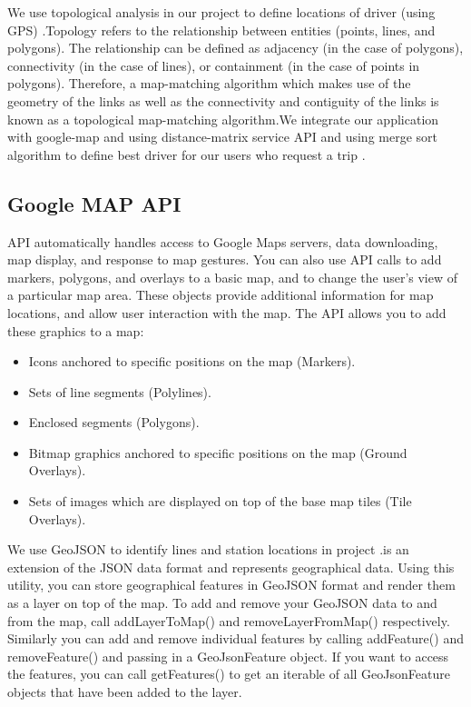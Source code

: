 We use topological analysis in our project to define locations of driver (using GPS) .Topology refers to the relationship between entities (points, lines, and polygons). The relationship can be defined as adjacency (in the case of polygons), connectivity (in the case of lines), or containment (in the
case of points in polygons). Therefore, a map-matching algorithm which makes use of the geometry of the
links as well as the connectivity and contiguity of the links is known as a topological map-matching algorithm.We integrate our application with google-map and using distance-matrix service API and using merge sort algorithm to define best driver for our users who request a trip .

\subsection{Google MAP API}

\hspace{2cm} API automatically handles access to Google Maps servers, data downloading, map display, and response to map gestures. You can also use API calls to add markers, polygons, and overlays to a basic map, and to change the user's view of a particular map area. These objects provide additional information for map locations, and allow user interaction with the map. The API allows you to add these graphics to a map:

\begin{itemize}
    
\item Icons anchored to specific positions on the map (Markers).
\item Sets of line segments (Polylines).
\item Enclosed segments (Polygons).
\item Bitmap graphics anchored to specific positions on the map (Ground Overlays).
\item Sets of images which are displayed on top of the base map tiles (Tile Overlays).
\end{itemize} \cite{am004}

We use GeoJSON to identify lines and station locations in project .is an extension of the JSON data format and represents geographical data. Using this utility, you can store geographical features in GeoJSON format and render them as a layer on top of the map. To add and remove your GeoJSON data to and from the map, call addLayerToMap() and removeLayerFromMap() respectively. Similarly you can add and remove individual features by calling addFeature() and removeFeature() and passing in a GeoJsonFeature object. If you want to access the features, you can call getFeatures() to get an iterable of all GeoJsonFeature objects that have been added to the layer.

